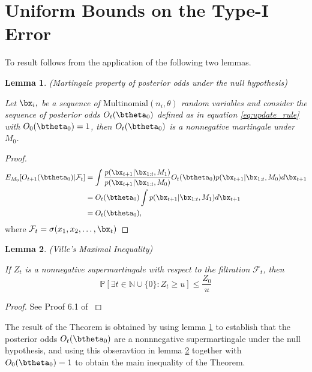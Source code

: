 \documentclass[11pt]{article}
\newtheorem{lemma}{Lemma}[section]
\begin{document}
\section{Uniform Bounds on the Type-I Error}
\label{app:type_1_error}
To result follows from the application of the following two lemmas.
\begin{lemma}(Martingale property of posterior odds under the null hypothesis)
  
  \noindent Let $\bx_i,$ be a sequence of $\text{Multinomial}(n_i,\theta)$ random variables and consider the sequence of posterior odds $O_t(\btheta_0)$ defined as in equation \eqref{eq:update_rule} with $O_0(\btheta_0)=1$, then $O_t(\btheta_0)$ is a nonnegative martingale under $M_0$.
  \label{lem:posterior_odds_martingale}
    \end{lemma}
  \begin{proof}
  \begin{align*}
    E_{M_0}[O_{t+1}(\btheta_0)|\mathcal{F}_t]  &= \int \frac{p(\bx_{t+1}|\bx_{1:t},M_1)}{p(\bx_{t+1}|\bx_{1:t},M_0)} O_{t}(\btheta_0) p(\bx_{t+1}|\bx_{1:t},M_0) d\bx_{t+1}\\
    &=  O_{t}(\btheta_0) \int p(\bx_{t+1}|\bx_{1:t},M_1) d\bx_{t+1}\\
    &=  O_{t}(\btheta_0),
  \end{align*}
  where $\mathcal{F}_{t} = \sigma(x_1,x_2,\dots, \bx_t)$
\end{proof}

\begin{lemma}(Ville's Maximal Inequality)
  
\label{lem:durrett}
  \noindent If $Z_{t}$ is a nonnegative supermartingale with respect to the filtration $\mathcal{F}_t$, then
  \begin{equation}
    \label{eq:durrett}
    \mathbb{P}[\exists t \in \mathbb{N}\cup \lbrace 0 \rbrace : Z_t \geq u] \leq \frac{Z_0}{u}
  \end{equation}
\end{lemma}
\begin{proof}
  See Proof 6.1 of \cite{howard}
\end{proof}
The result of the Theorem is obtained by using lemma \ref{lem:posterior_odds_martingale} to establish that the posterior odds $O_t(\btheta_0)$ are a nonnnegative supermartingale under the null hypothesis, and using this obseravtion in lemma \ref{lem:durrett} together with  $O_0(\btheta_0) = 1$  to obtain the main inequality of the Theorem.
\end{document}
